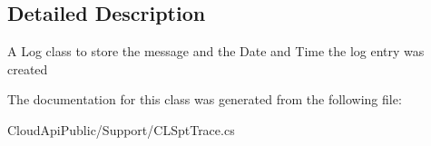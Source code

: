 \subsection{Detailed Description}
A Log class to store the message and the Date and Time the log entry was created 



The documentation for this class was generated from the following file\-:\begin{DoxyCompactItemize}
\item 
Cloud\-Api\-Public/\-Support/C\-L\-Spt\-Trace.\-cs\end{DoxyCompactItemize}
